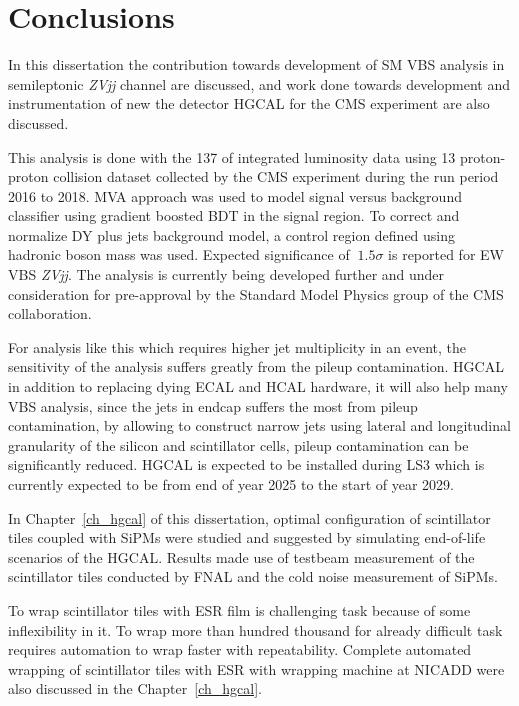 \chapter{
  Conclusions
 }\label{ch_results}

In this dissertation the contribution towards
development of \gls{SM} \gls{VBS}
analysis in semileptonic \textit{ZVjj} channel are discussed, and work
done towards development and instrumentation of new the detector
\gls{HGCAL} for the \gls{CMS} experiment are also discussed.

This analysis is done with the 137 \fbinv{} of integrated luminosity data
using 13\TeV{} proton-proton collision
dataset collected by the \gls{CMS} experiment during the run period 2016 to 2018.
\gls{MVA} approach was used to
model signal versus background classifier using gradient boosted
\gls{BDT} in the signal region. To correct
and normalize DY plus jets background model, a control region
defined using hadronic boson mass was used.
Expected significance of \( ~1.5\sigma \) is reported for
\gls{EW} \gls{VBS} \textit{ZVjj}.
The analysis is currently being developed further
and under consideration for pre-approval by the Standard Model Physics
group of the \gls{CMS} collaboration.

For analysis like this which requires higher jet multiplicity
in an event, the sensitivity of the analysis suffers
greatly from the pileup contamination.
\gls{HGCAL} in addition to replacing dying \gls{ECAL} and \gls{HCAL}
hardware, it will also help many \gls{VBS} analysis,
since the jets in endcap suffers the most from pileup
contamination, by allowing to construct narrow jets
using lateral and longitudinal granularity of the silicon and scintillator cells,
pileup contamination can be significantly reduced.
\gls{HGCAL} is expected to be installed
during \gls{LS3} which is currently expected to be from end of year 2025
to the start of year 2029.

In Chapter~\ref{ch_hgcal} of this dissertation, optimal configuration
of scintillator tiles coupled with \glspl{SiPM}
were studied and suggested by simulating end-of-life scenarios
of the \gls{HGCAL}. Results made use of testbeam measurement of
the scintillator tiles conducted by \gls{FNAL}
and the cold noise measurement of \glspl{SiPM}.

To wrap scintillator tiles with
\gls{ESR} film is challenging task because of some inflexibility
in it. To wrap more than hundred thousand
for already difficult task requires
automation to wrap faster with repeatability.
Complete automated wrapping of scintillator tiles with
\gls{ESR} with wrapping machine at \gls{NICADD} were also discussed
in the Chapter~\ref{ch_hgcal}.